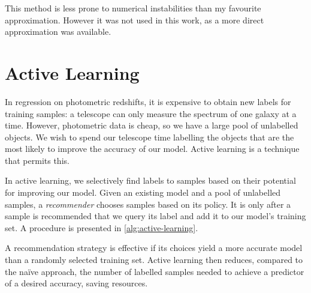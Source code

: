 \documentclass[11pt,twoside,openright]{report}
\begin{document}
This method is less prone to numerical instabilities than my favourite approximation. However it was not used in this work, as a more direct approximation was available.


\chapter{Active Learning}

In regression on photometric redshifts, it is expensive to obtain new labels for training samples: a telescope can only measure the spectrum of one galaxy at a time. However, photometric data is cheap, so we have a large pool of unlabelled objects. We wish to spend our telescope time labelling the objects that are the most likely to improve the accuracy of our model. Active learning is a technique that permits this.

In active learning, we selectively find labels to samples based on their potential for improving our model. Given an existing model and a pool of unlabelled samples, a \textit{recommender} chooses samples based on its policy. It is only after a sample is recommended that we query its label and add it to our model's training set. A procedure is presented in \cref{alg:active-learning}.

A recommendation strategy is effective if its choices yield a more accurate model than a randomly selected training set. Active learning then reduces, compared to the naïve approach, the number of labelled samples needed to achieve a predictor of a desired accuracy, saving resources.
\end{document}
